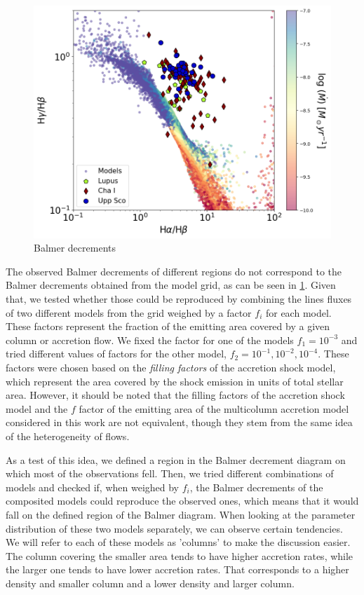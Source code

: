 \documentclass[twocolumn,linenumbers]{aastex631}
\begin{document}
\begin{figure}
    \centering
    \includegraphics[width=0.8\linewidth]{figures/BalmerDecrements.png}
    \caption{Balmer decrements}
    \label{fig:balmer_decrement}
\end{figure}

The observed Balmer decrements of different regions do not correspond to the Balmer decrements obtained from the model grid, as can be seen in \ref{fig:balmer_decrement}. Given that, we tested whether those could be reproduced by combining the lines fluxes of two different models from the grid weighed by a factor $f_i$ for each model. These factors represent the fraction of the emitting area covered by a given column or accretion flow. We fixed the factor for one of the models $f_1=10^{-3}$ and tried different values of factors for the other model, $f_2 = 10^{-1},10^{-2},10^{-4}$. These factors were chosen based on the \textit{filling factors} of the accretion shock model, which represent the area covered by the shock emission in units of total stellar area. However, it should be noted that the filling factors of the accretion shock model and the $f$ factor of the emitting area of the multicolumn accretion model considered in this work are not equivalent, though they stem from the same idea of the heterogeneity of flows. 

As a test of this idea, we defined a region in the Balmer decrement diagram on which most of the observations fell. Then, we tried different combinations of models and checked if, when weighed by $f_i$, the Balmer decrements of the composited models could reproduce the observed ones, which means that it would fall on the defined region of the Balmer diagram. When looking at the parameter distribution of these two models separately, we can observe certain tendencies. We will refer to each of these models as 'columns' to make the discussion easier. The column covering the smaller area tends to have higher accretion rates, while the larger one tends to have lower accretion rates. That corresponds to a higher density and smaller column and a lower density and larger column.
\end{document}
